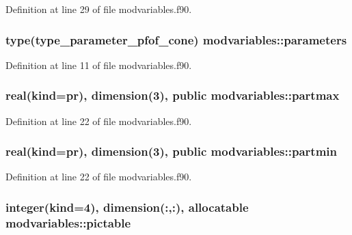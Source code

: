 Definition at line 29 of file modvariables.\-f90.

\hypertarget{classmodvariables_a3a05eb7a0d11075c67b3f7c927170b48}{
\subsubsection[{parameters}]{\setlength{\rightskip}{0pt plus 5cm}type(type\-\_\-parameter\-\_\-pfof\-\_\-cone) modvariables\-::parameters}}\label{classmodvariables_a3a05eb7a0d11075c67b3f7c927170b48}


Definition at line 11 of file modvariables.\-f90.

\hypertarget{classmodvariables_aa4d6e284cd4d33fbf81f05c0f7604fd0}{
\subsubsection[{partmax}]{\setlength{\rightskip}{0pt plus 5cm}real(kind=pr), dimension(3), public modvariables\-::partmax}}\label{classmodvariables_aa4d6e284cd4d33fbf81f05c0f7604fd0}


Definition at line 22 of file modvariables.\-f90.

\hypertarget{classmodvariables_a103c50d97008cd05f4781b820a51e4cb}{
\subsubsection[{partmin}]{\setlength{\rightskip}{0pt plus 5cm}real(kind=pr), dimension(3), public modvariables\-::partmin}}\label{classmodvariables_a103c50d97008cd05f4781b820a51e4cb}


Definition at line 22 of file modvariables.\-f90.

\hypertarget{classmodvariables_aa09a585a04de1f8fba311a2f440db992}{
\subsubsection[{pictable}]{\setlength{\rightskip}{0pt plus 5cm}integer(kind=4), dimension(\-:,\-:), allocatable modvariables\-::pictable}}\label{classmodvariables_aa09a585a04de1f8fba311a2f440db992}


